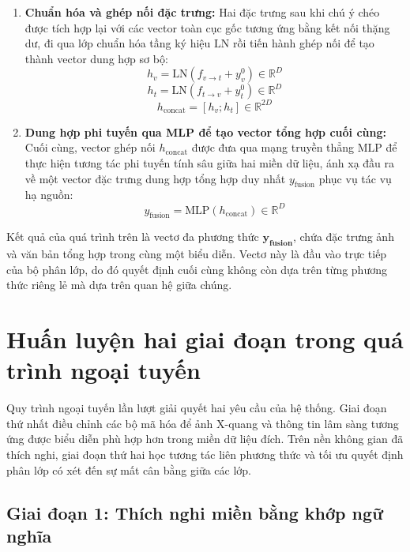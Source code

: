 \begin{enumerate}
    \item \textbf{Chuẩn hóa và ghép nối đặc trưng:}
    Hai đặc trưng sau khi chú ý chéo được tích hợp lại với các vector toàn cục gốc tương ứng bằng kết nối thặng dư, đi qua lớp chuẩn hóa tầng ký hiệu $\text{LN}$ rồi tiến hành ghép nối để tạo thành vector dung hợp sơ bộ:
    \begin{equation}
    h_v = \text{LN}(f_{v \to t} + y_v^0) \in \mathbb{R}^D
    \end{equation}
    \begin{equation}
    h_t = \text{LN}(f_{t \to v} + y_t^0) \in \mathbb{R}^D
    \end{equation}
    \begin{equation}
    h_{\text{concat}} = [h_v ; h_t] \in \mathbb{R}^{2D}
    \end{equation}

    \item \textbf{Dung hợp phi tuyến qua MLP để tạo vector tổng hợp cuối cùng:}
    Cuối cùng, vector ghép nối $h_{\text{concat}}$ được đưa qua mạng truyền thẳng $\text{MLP}$ để thực hiện tương tác phi tuyến tính sâu giữa hai miền dữ liệu, ánh xạ đầu ra về một vector đặc trưng dung hợp tổng hợp duy nhất $y_{\text{fusion}}$ phục vụ tác vụ hạ nguồn:
    \begin{equation}
    y_{\text{fusion}} = \text{MLP}(h_{\text{concat}}) \in \mathbb{R}^D
    \end{equation}
\end{enumerate}

Kết quả của quá trình trên là vectơ đa phương thức $\boldsymbol{y_{fusion}}$, chứa đặc trưng ảnh và văn bản tổng hợp trong cùng một biểu diễn. Vectơ này là đầu vào trực tiếp của bộ phân lớp, do đó quyết định cuối cùng không còn dựa trên từng phương thức riêng lẻ mà dựa trên quan hệ giữa chúng.

\section{Huấn luyện hai giai đoạn trong quá trình ngoại tuyến}
\label{sec:ch3_offline_training}
Quy trình ngoại tuyến lần lượt giải quyết hai yêu cầu của hệ thống. Giai đoạn thứ nhất điều chỉnh các bộ mã hóa để ảnh X-quang và thông tin lâm sàng tương ứng được biểu diễn phù hợp hơn trong miền dữ liệu đích. Trên nền không gian đã thích nghi, giai đoạn thứ hai học tương tác liên phương thức và tối ưu quyết định phân lớp có xét đến sự mất cân bằng giữa các lớp.

\subsection{Giai đoạn 1: Thích nghi miền bằng khớp ngữ nghĩa}


